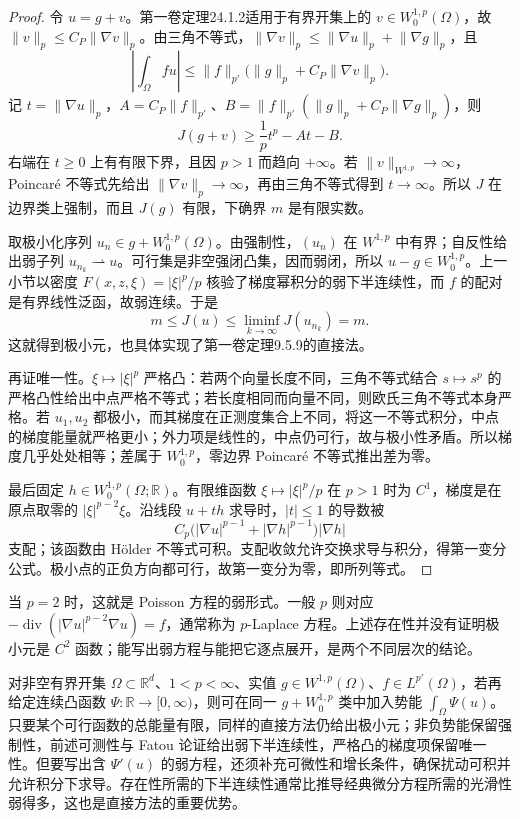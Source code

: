 \begin{proof}
令 \(u=g+v\)。第一卷定理24.1.2适用于有界开集上的 \(v\in W_0^{1,p}(\Omega)\)，故 \(\|v\|_p\leq C_P\|\nabla v\|_p\)。由三角不等式，\(\lVert\nabla v\rVert_p\le\lVert\nabla u\rVert_p+\lVert\nabla g\rVert_p\)，且
\[\left|\int_\Omega fu\right|\le\lVert f\rVert_{p'}\bigl(\lVert g\rVert_p+C_P\lVert\nabla v\rVert_p\bigr).\]
记 \(t=\|\nabla u\|_p\)，\(A=C_P\|f\|_{p'}\)、\(B=\|f\|_{p'}(\|g\|_p+C_P\|\nabla g\|_p)\)，则
\[
 J(g+v)\geq\frac1p t^p-At-B.
\]
右端在 \(t\geq0\) 上有有限下界，且因 \(p>1\) 而趋向 \(+\infty\)。若 \(\|v\|_{W^{1,p}}\to\infty\)，Poincaré 不等式先给出 \(\|\nabla v\|_p\to\infty\)，再由三角不等式得到 \(t\to\infty\)。所以 \(J\) 在边界类上强制，而且 \(J(g)\) 有限，下确界 \(m\) 是有限实数。

取极小化序列 \(u_n\in g+W_0^{1,p}(\Omega)\)。由强制性，\((u_n)\) 在 \(W^{1,p}\) 中有界；自反性给出弱子列 \(u_{n_k}\rightharpoonup u\)。可行集是非空强闭凸集，因而弱闭，所以 \(u-g\in W_0^{1,p}\)。上一小节以密度 \(F(x,z,\xi)=|\xi|^p/p\) 核验了梯度幂积分的弱下半连续性，而 \(f\) 的配对是有界线性泛函，故弱连续。于是
\[
 m\leq J(u)\leq\liminf_{k\to\infty}J(u_{n_k})=m.
\]
这就得到极小元，也具体实现了第一卷定理9.5.9的直接法。

再证唯一性。\(\xi\mapsto|\xi|^p\) 严格凸：若两个向量长度不同，三角不等式结合 \(s\mapsto s^p\) 的严格凸性给出中点严格不等式；若长度相同而向量不同，则欧氏三角不等式本身严格。若 \(u_1,u_2\) 都极小，而其梯度在正测度集合上不同，将这一不等式积分，中点的梯度能量就严格更小；外力项是线性的，中点仍可行，故与极小性矛盾。所以梯度几乎处处相等；差属于 \(W_0^{1,p}\)，零边界 Poincaré 不等式推出差为零。

最后固定 \(h\in W_0^{1,p}(\Omega;\mathbb R)\)。有限维函数 \(\xi\mapsto|\xi|^p/p\) 在 \(p>1\) 时为 \(C^1\)，梯度是在原点取零的 \(|\xi|^{p-2}\xi\)。沿线段 \(u+th\) 求导时，\(|t|\le1\) 的导数被
\[C_p\bigl(|\nabla u|^{p-1}+|\nabla h|^{p-1}\bigr)|\nabla h|\]
支配；该函数由 Hölder 不等式可积。支配收敛允许交换求导与积分，得第一变分公式。极小点的正负方向都可行，故第一变分为零，即所列等式。
\end{proof}

当 \(p=2\) 时，这就是 Poisson 方程的弱形式。一般 \(p\) 则对应 \(-\operatorname{div}(|\nabla u|^{p-2}\nabla u)=f\)，通常称为 \(p\)-Laplace 方程。上述存在性并没有证明极小元是 \(C^2\) 函数；能写出弱方程与能把它逐点展开，是两个不同层次的结论。

\ProseParagraphBreak

对非空有界开集 \(\Omega\subset\mathbb R^d\)、\(1<p<\infty\)、实值 \(g\in W^{1,p}(\Omega)\)、\(f\in L^{p'}(\Omega)\)，若再给定连续凸函数 \(\Psi:\mathbb R\to[0,\infty)\)，则可在同一 \(g+W_0^{1,p}\) 类中加入势能 \(\int_\Omega\Psi(u)\)。只要某个可行函数的总能量有限，同样的直接方法仍给出极小元；非负势能保留强制性，前述可测性与 Fatou 论证给出弱下半连续性，严格凸的梯度项保留唯一性。但要写出含 \(\Psi'(u)\) 的弱方程，还须补充可微性和增长条件，确保扰动可积并允许积分下求导。存在性所需的下半连续性通常比推导经典微分方程所需的光滑性弱得多，这也是直接方法的重要优势。


